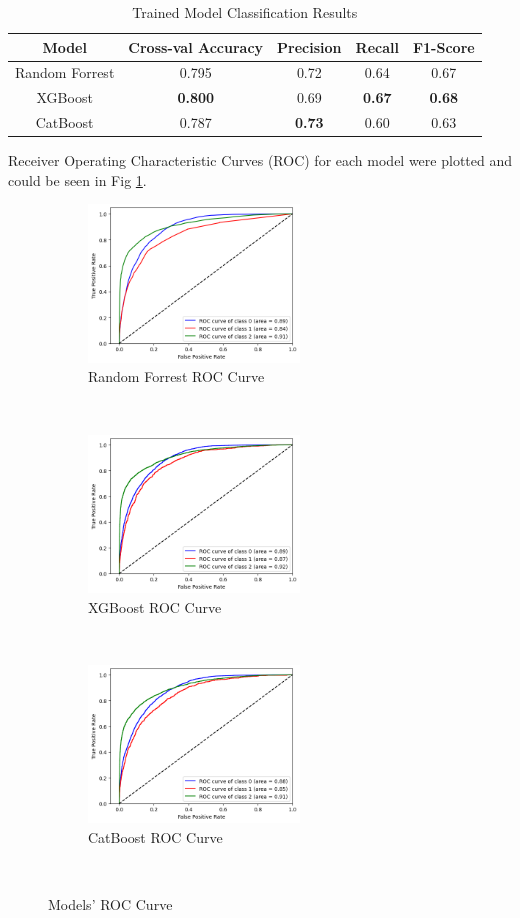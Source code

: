 \documentclass[conference]{IEEEtran}
\begin{document}
\begin{table}[H]
  \centering
  \caption{Trained Model Classification Results}
  \label{tab:jason_model}
  \begin{tabular}{|c|c|c|c|c|}
    \hline
    \textbf{Model} & \textbf{Cross-val Accuracy} & \textbf{Precision} & \textbf{Recall} &\textbf{F1-Score} \\ \hline
    Random Forrest	& 0.795 & 0.72 & 0.64 & 0.67\\
    \hline
    XGBoost &\textbf{0.800} & 0.69 & \textbf{0.67} & \textbf{0.68} \\
    \hline
    CatBoost & 0.787 & \textbf{0.73} & 0.60 & 0.63 \\
    \hline
  \end{tabular}
\end{table}

Receiver Operating Characteristic Curves (ROC) for each model were plotted and could be seen in Fig \ref{fig:roc_curve}.

\begin{figure}[t!]
  \centering
  \begin{subfigure}[t]{0.3\textwidth}
      \centering
      \includegraphics[height=1.65in]{figures/jason_rf.png}
      \caption{Random Forrest ROC Curve}
  \end{subfigure}%
  ~
  \begin{subfigure}[t]{0.3\textwidth}
      \centering
      \includegraphics[height=1.65in]{figures/jason_xg.png}
      \caption{XGBoost ROC Curve}
  \end{subfigure}
  ~
  \begin{subfigure}[t]{0.3\textwidth}
      \centering
      \includegraphics[height=1.65in]{figures/jason_cat.png}
      \caption{CatBoost ROC Curve}
  \end{subfigure}
  ~
  \caption{Models' ROC Curve}
  \label{fig:roc_curve}
\end{figure}
\end{document}
